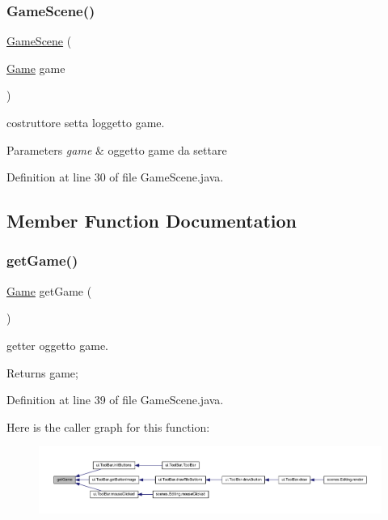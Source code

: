 \subsubsection{\texorpdfstring{Game\+Scene()}{GameScene()}}
{\footnotesize\ttfamily \hyperlink{classscenes_1_1_game_scene}{Game\+Scene} (\begin{DoxyParamCaption}\item[{\hyperlink{classprogetto_1_1_game}{Game}}]{game }\end{DoxyParamCaption})}



costruttore setta l\textquotesingle{}oggetto game. 


\begin{DoxyParams}{Parameters}
{\em game} & oggetto game da settare \\
\hline
\end{DoxyParams}


Definition at line 30 of file Game\+Scene.\+java.



\subsection{Member Function Documentation}
\mbox{\label{classscenes_1_1_game_scene_af764ff126134eee0117e7e212faee455}} 
\subsubsection{\texorpdfstring{get\+Game()}{getGame()}}
{\footnotesize\ttfamily \hyperlink{classprogetto_1_1_game}{Game} get\+Game (\begin{DoxyParamCaption}{ }\end{DoxyParamCaption})}



getter oggetto game. 

\begin{DoxyReturn}{Returns}
game; 
\end{DoxyReturn}


Definition at line 39 of file Game\+Scene.\+java.

Here is the caller graph for this function\+:\nopagebreak
\begin{figure}[H]
\begin{center}
\leavevmode
\includegraphics[width=350pt]{classscenes_1_1_game_scene_af764ff126134eee0117e7e212faee455_icgraph}
\end{center}
\end{figure}


